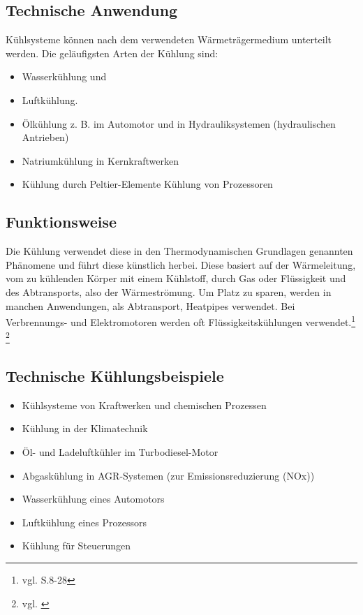 \newpage

\subsection{Technische Anwendung}

Kühlsysteme können nach dem verwendeten Wärmeträgermedium unterteilt werden. Die geläufigsten Arten der Kühlung sind:

\begin{itemize}
	\item Wasserkühlung und
	\item Luftkühlung.
	\item Ölkühlung z.  B. im Automotor und in Hydrauliksystemen (hydraulischen Antrieben) 
	\item Natriumkühlung in Kernkraftwerken
	\item Kühlung durch Peltier-Elemente Kühlung von Prozessoren
\end{itemize}

\subsection{Funktionsweise}

Die Kühlung verwendet diese in den Thermodynamischen Grundlagen genannten Phänomene und führt diese künstlich herbei. Diese basiert auf der Wärmeleitung, vom zu kühlenden Körper mit einem Kühlstoff, durch Gas oder Flüssigkeit und des Abtransports, also der Wärmeströmung. Um Platz zu sparen, werden in manchen Anwendungen, als Abtransport, Heatpipes verwendet. Bei Verbrennungs- und Elektromotoren werden oft Flüssigkeitskühlungen verwendet.\footnote{vgl. \cite{Kuehlung1} S.8-28} \footnote{vgl. \cite{Kuehlung2}}

\subsection{Technische Kühlungsbeispiele}

\begin{itemize}
	\item Kühlsysteme von Kraftwerken und chemischen Prozessen
	\item Kühlung in der Klimatechnik
	\item Öl- und Ladeluftkühler im Turbodiesel-Motor
	\item Abgaskühlung in AGR-Systemen (zur Emissionsreduzierung (NOx))
	\item Wasserkühlung eines Automotors
	\item Luftkühlung eines Prozessors
	\item Kühlung für Steuerungen
\end{itemize}

